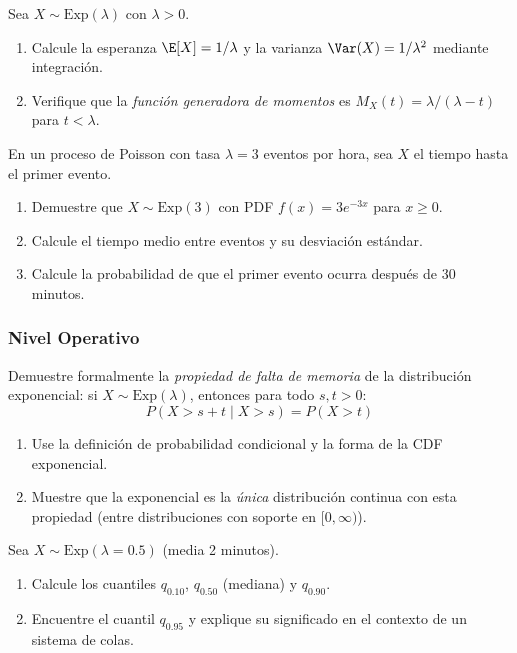 \begin{problema}
	\label{prob:4.5.2}
	Sea $X \sim \text{Exp}(\lambda)$ con $\lambda > 0$.
	\begin{enumerate}
		\item Calcule la esperanza $\E[X] = 1/\lambda$ y la varianza $\Var(X) = 1/\lambda^{2}$ mediante integración.
		\item Verifique que la \emph{función generadora de momentos} es $M_{X}(t) = \lambda/(\lambda - t)$ para $t < \lambda$.
	\end{enumerate}
\end{problema}

\begin{problema}
	\label{prob:4.5.3}
	En un proceso de Poisson con tasa $\lambda = 3$ eventos por hora, sea $X$ el tiempo hasta el primer evento.
	\begin{enumerate}
		\item Demuestre que $X \sim \text{Exp}(3)$ con PDF $f(x) = 3e^{-3x}$ para $x \ge 0$.
		\item Calcule el tiempo medio entre eventos y su desviación estándar.
		\item Calcule la probabilidad de que el primer evento ocurra después de 30 minutos.
	\end{enumerate}
\end{problema}

\subsubsection*{Nivel Operativo}

\begin{problema}
	\label{prob:4.5.4}
	Demuestre formalmente la \emph{propiedad de falta de memoria} de la distribución exponencial: si $X \sim \text{Exp}(\lambda)$, entonces para todo $s, t > 0$:
	$$P(X > s + t \mid X > s) = P(X > t)$$
	\begin{enumerate}
		\item Use la definición de probabilidad condicional y la forma de la CDF exponencial.
		\item Muestre que la exponencial es la \emph{única} distribución continua con esta propiedad (entre distribuciones con soporte en $[0, \infty)$).
	\end{enumerate}
\end{problema}

\begin{problema}
	\label{prob:4.5.5}
	Sea $X \sim \text{Exp}(\lambda = 0.5)$ (media 2 minutos).
	\begin{enumerate}
		\item Calcule los cuantiles $q_{0.10}$, $q_{0.50}$ (mediana) y $q_{0.90}$.
		\item Encuentre el cuantil $q_{0.95}$ y explique su significado en el contexto de un sistema de colas.
	\end{enumerate}
\end{problema}

